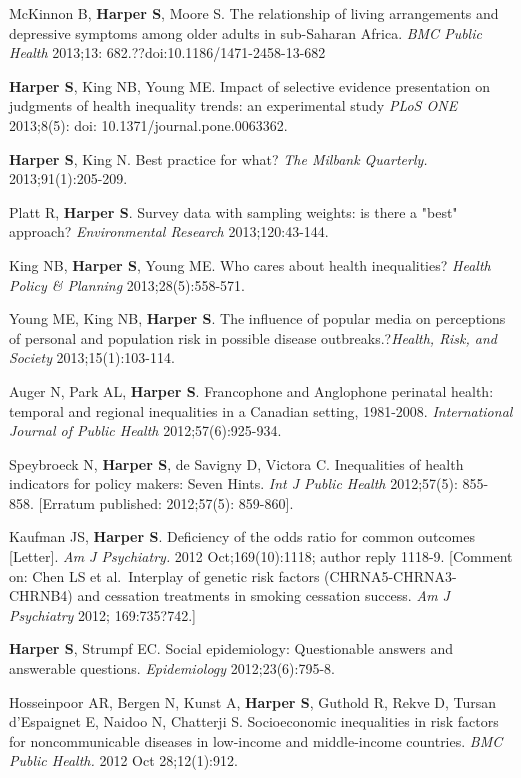 \documentclass[
  letterpaper,
  DIV=11,
  numbers=noendperiod]{scrartcl}
\begin{document}
McKinnon B, \textbf{Harper S}, Moore S. The relationship of living
arrangements and depressive symptoms among older adults in sub-Saharan
Africa. \emph{BMC Public Health} 2013;13:
682.??doi:10.1186/1471-2458-13-682

\textbf{Harper S}, King NB, Young ME. Impact of selective evidence
presentation on judgments of health inequality trends: an experimental
study \emph{PLoS ONE} 2013;8(5): doi: 10.1371/journal.pone.0063362.

\textbf{Harper S}, King N. Best practice for what? \emph{The Milbank
Quarterly.} 2013;91(1):205-209.

Platt R, \textbf{Harper S}. Survey data with sampling weights: is there
a "best" approach? \emph{Environmental Research} 2013;120:43-144.

King NB, \textbf{Harper S}, Young ME. Who cares about health
inequalities? \emph{Health Policy \& Planning} 2013;28(5):558-571.

Young ME, King NB, \textbf{Harper S}. The influence of popular media on
perceptions of personal and population risk in possible disease
outbreaks.?\emph{Health, Risk, and Society} 2013;15(1):103-114.

Auger N, Park AL, \textbf{Harper S}. Francophone and Anglophone
perinatal health: temporal and regional inequalities in a Canadian
setting, 1981-2008. \emph{International Journal of Public Health}
2012;57(6):925-934.

Speybroeck N, \textbf{Harper S}, de Savigny D, Victora C. Inequalities
of health indicators for policy makers: Seven Hints. \emph{Int J Public
Health} 2012;57(5): 855-858. {[}Erratum published: 2012;57(5):
859-860{]}.

Kaufman JS, \textbf{Harper S}. Deficiency of the odds ratio for common
outcomes {[}Letter{]}. \emph{Am J Psychiatry.} 2012 Oct;169(10):1118;
author reply 1118-9. {[}Comment on: Chen LS et al.~Interplay of genetic
risk factors (CHRNA5-CHRNA3-CHRNB4) and cessation treatments in smoking
cessation success. \emph{Am J Psychiatry} 2012; 169:735?742.{]}

\textbf{Harper S}, Strumpf EC. Social epidemiology: Questionable answers
and answerable questions. \emph{Epidemiology} 2012;23(6):795-8.

Hosseinpoor AR, Bergen N, Kunst A, \textbf{Harper S}, Guthold R, Rekve
D, Tursan d'Espaignet E, Naidoo N, Chatterji S. Socioeconomic
inequalities in risk factors for noncommunicable diseases in low-income
and middle-income countries. \emph{BMC Public Health.} 2012 Oct
28;12(1):912.
\end{document}
